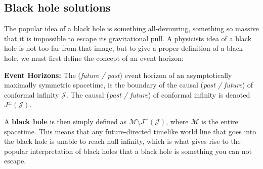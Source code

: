 \subsection{Black hole solutions}
%
The popular idea of a black hole is something all-devouring, something so massive that it is impossible to escape its gravitational pull. A physicists idea of a black hole is not too far from that image, but to give a proper definition of a black hole, we must first define the concept of an event horizon:
%
\theoremstyle{definition}
%
\begin{definition}{\textbf{Event Horizons:}}
The (\textit{future / past}) event horizon of an asymptotically maximally symmetric spacetime, is the boundary of the causal (\textit{past / future}) of conformal infinity $\mathcal{J}$. The causal (\textit{past / future}) of conformal infinity is denoted $J^{\pm}(\mathcal{J})$.
\end{definition}
%
%
\noindent
A \textbf{black hole} is then simply defined as $\mathcal{M} \setminus J^{-}(\mathcal{J})$, where $\mathcal{M}$ is the entire spacetime. This means that any future-directed timelike world line that goes into the black hole is unable to reach null infinity, which is what gives rise to the popular interpretation of black holes that a black hole is something you can not escape.
%
%
